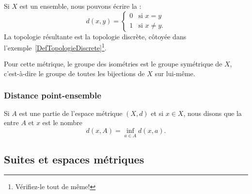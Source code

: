 \begin{example}
    Si \( X\) est un ensemble, nous pouvons écrire la  :
    \begin{equation}
        d(x,y)=\begin{cases}
            0    &   \text{si } x=y\\
            1    &    \text{si } x\neq y\text{.}
        \end{cases}
    \end{equation}
    La topologie résultante est la topologie discrète, côtoyée dans l'exemple~\ref{DefTopologieDiscrete}\footnote{Vérifiez-le tout de même!}.

    Pour cette métrique, le groupe des isométries est le groupe symétrique de \( X\), c'est-à-dire le groupe de toutes les bijections de \( X\) sur lui-même.
\end{example}

\subsubsection{Distance point-ensemble}

\begin{definition}
	Si $A$ est une partie de l'espace métrique $(X,d)$ et si $x\in X$, nous disons que la  entre $A$ et $x$ est le nombre
	\begin{equation}		\label{EqdefDistaA}
		d(x,A)=\inf_{a\in A}d(x,a).
	\end{equation}
\end{definition}
\newcommand{\CaptionFigDistanceEnsemble}{La distance entre $x$ et $A$ est donnée par la distance entre $x$ et $p$. Les distances entre $x$ et les autres points de $A$ sont plus grandes que $d(x,p)$.}


\subsection{Suites et espaces métriques}


